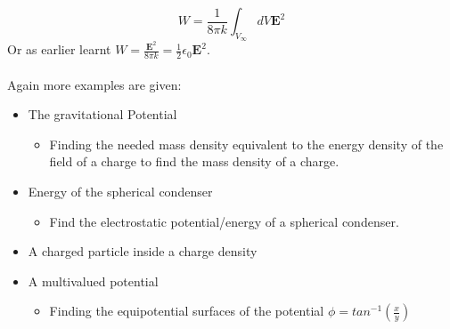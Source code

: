 \begin{equation}
    W = \frac{1}{8\pi k} \int_{V_\infty} dV \textbf{E}^2 
\end{equation}
Or as earlier learnt $\displaystyle W = \frac{\textbf{E}^2}{8\pi k} = \frac{1}{2}\epsilon_0 \textbf{E}^2 $.\\
\\
Again more examples are given:
\begin{itemize}
    \item The gravitational Potential
    \begin{itemize}
        \item Finding the needed mass density equivalent to the energy density of the field of a charge to find the mass density of a charge. 
    \end{itemize}
    \item Energy of the spherical condenser
    \begin{itemize}
        \item Find the electrostatic potential/energy of a spherical condenser.
    \end{itemize}
    \item A charged particle inside a charge density
    \item A multivalued potential
    \begin{itemize}
        \item Finding the equipotential surfaces of the potential $\phi = tan^{-1}(\frac{x}{y})$
    \end{itemize}
\end{itemize}
